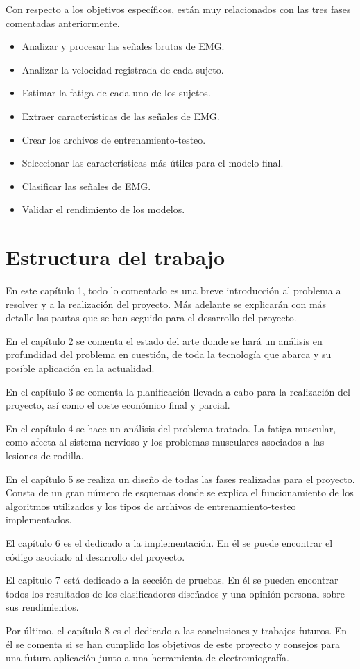 Con respecto a los objetivos específicos, están muy relacionados con las tres fases comentadas anteriormente.
\begin{itemize}
\item Analizar y procesar las señales brutas de EMG.
\item Analizar la velocidad registrada de cada sujeto.
\item Estimar la fatiga de cada uno de los sujetos.
\item Extraer características de las señales de EMG.
\item Crear los archivos de entrenamiento-testeo.
\item Seleccionar las características más útiles para el modelo final.
\item Clasificar las señales de EMG. 
\item Validar el rendimiento de los modelos.
\end{itemize}
\section{Estructura del trabajo}
En este capítulo 1, todo lo comentado es una breve introducción al problema a resolver y a la realización del proyecto. Más adelante se explicarán con más detalle las pautas que se han seguido para el desarrollo del proyecto.

En el capítulo 2 se comenta el estado del arte donde se hará un análisis en profundidad del problema en cuestión, de toda la tecnología que abarca y su posible aplicación en la actualidad.


En el capítulo 3 se comenta la planificación llevada a cabo para la realización del proyecto, así como el coste económico final y parcial.

En el capítulo 4 se hace un análisis del problema tratado. La fatiga muscular, como afecta al sistema nervioso y los problemas musculares asociados a las lesiones de rodilla.

En el capítulo 5 se realiza un diseño de todas las fases realizadas para el proyecto. Consta de un gran número de esquemas donde se explica el funcionamiento de los algoritmos utilizados y los tipos de archivos de entrenamiento-testeo implementados.

El capítulo 6 es el dedicado a la implementación. En él se puede encontrar el código asociado al desarrollo del proyecto.

El capitulo 7 está dedicado a la sección de pruebas. En él se pueden encontrar todos los resultados de los clasificadores diseñados y una opinión personal sobre sus rendimientos.

Por último, el capítulo 8 es el dedicado a las conclusiones y trabajos futuros. En él se comenta si se han cumplido los objetivos de este proyecto y consejos para una futura aplicación junto a una herramienta de electromiografía.


